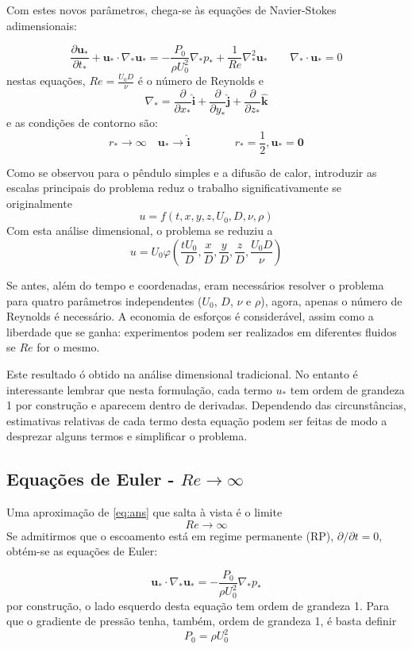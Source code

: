 \documentclass[article,12pt,oneside,a4paper,english,brazil,sumario=tradicional]{abntex2}
\newcommand{\p}[1]{\ensuremath{ \mathbf{#1}}}    %
\newcommand{\lra}{\ensuremath{\longrightarrow}}
\newcommand{\qqrq}{\ensuremath{\qquad\lra\qquad}}
\newcommand{\pd}{\ensuremath{\partial}}
\begin{document}
Com estes novos parâmetros, chega-se às equações de Navier-Stokes adimensionais:

\begin{equation}
\frac{\pd\p{u}_*}{\pd t_*} + \p{u}_*\cdot\nabla_*\p{u_*} = -\frac{P_0}{\rho U_0^2}\nabla_* p_* + \frac{1}{Re}\nabla_*^2\p{u}_* \qquad \nabla_*\cdot\p{u}_* = 0
\label{eq:ans}
\end{equation}
nestas equações, $Re = \frac{U_0 D}{\nu}$ é o número de Reynolds e 
\[
\nabla_* = \frac{\pd}{\pd x_*} \p{\hat{i}} + \frac{\pd}{\pd y_*} \p{\hat{j}} + \frac{\pd}{\pd z_*} \p{\hat{k}}
\]
e as condições de contorno são:
\[
 r_*\lra\infty \quad \p{u}_*\lra \p{\hat{i}} \qquad\qquad r_*=\frac{1}{2}, \p{u}_* = \p{0}
\]

Como se observou para o pêndulo simples e a difusão de calor, introduzir as escalas principais do problema reduz o trabalho significativamente se originalmente
\[
u = f(t, x, y, z, U_0, D, \nu, \rho)
\]
Com esta análise dimensional, o problema se reduziu a 
\[
u = U_0 \varphi\left(\frac{t U_0}{D}, \frac{x}{D}, \frac{y}{D}, \frac{z}{D}, \frac{U_0 D}{\nu}\right)
\]

Se antes, além do tempo e coordenadas,  eram  necessários resolver o problema para quatro parâmetros independentes ($U_0$, $D$, $\nu$ e $\rho$), agora, apenas o número de Reynolds é necessário. A economia de esforços é considerável, assim como a liberdade que se ganha: experimentos podem ser realizados em diferentes fluidos se $Re$ for o mesmo.

Este resultado ó obtido na análise dimensional tradicional. No entanto é interessante lembrar que nesta formulação, cada termo $u_*$ tem ordem de grandeza 1 por construção e aparecem dentro de derivadas. Dependendo das circunstâncias, estimativas relativas de cada termo desta equação podem ser feitas de modo a desprezar alguns termos e simplificar o problema.

\subsection{Equações de Euler - $Re\lra\infty$}

Uma aproximação de \ref{eq:ans} que salta à vista é o limite 
\[
Re \lra\infty
\]
Se admitirmos que o escoamento está em regime permanente (RP), $\pd/\pd t = 0$, obtém-se as equações de Euler:

\begin{equation}
\p{u}_*\cdot\nabla_*\p{u_*} = -\frac{P_0}{\rho U_0^2}\nabla_* p_* %
\label{eq:euler}
\end{equation}
por construção, o lado esquerdo desta equação tem ordem de grandeza 1. Para que o gradiente de pressão tenha, também, ordem de grandeza 1, é basta definir  
\[
P_0 = \rho U_0^2
\]
\end{document}
